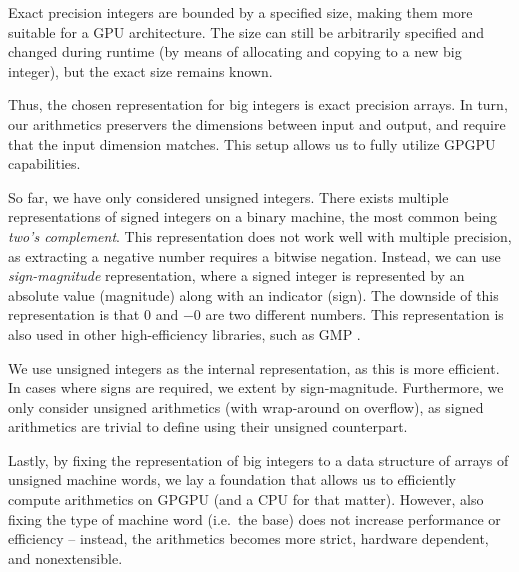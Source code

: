 Exact precision integers are bounded by a specified size, making them more
suitable for a GPU architecture. The size can still be arbitrarily specified and
changed during runtime (by means of allocating and copying to a new big
integer), but the exact size remains known.

Thus, the chosen representation for big integers is exact precision arrays. In
turn, our arithmetics preservers the dimensions between input and output, and
require that the input dimension matches. This setup allows us to fully utilize
GPGPU capabilities. \bigskip

So far, we have only considered unsigned integers. There exists multiple
representations of signed integers on a binary machine, the most common being
\textit{two's complement}. This representation does not work well with multiple
precision, as extracting a negative number requires a bitwise negation. Instead,
we can use \textit{sign-magnitude} representation, where a signed integer is
represented by an absolute value (magnitude) along with an indicator (sign). The
downside of this representation is that $0$ and $-0$ are two different
numbers. This representation is also used in other high-efficiency libraries,
such as GMP \cite{GMP}.

We use unsigned integers as the internal representation, as this is more
efficient. In cases where signs are required, we extent by
sign-magnitude. Furthermore, we only consider unsigned arithmetics (with
wrap-around on overflow), as signed arithmetics are trivial to define using
their unsigned counterpart. \bigskip

Lastly, by fixing the representation of big integers to a data structure of
arrays of unsigned machine words, we lay a foundation that allows us to
efficiently compute arithmetics on GPGPU (and a CPU for that matter). However,
also fixing the type of machine word (i.e.\ the base) does not increase
performance or efficiency -- instead, the arithmetics becomes more strict,
hardware dependent, and nonextensible.

